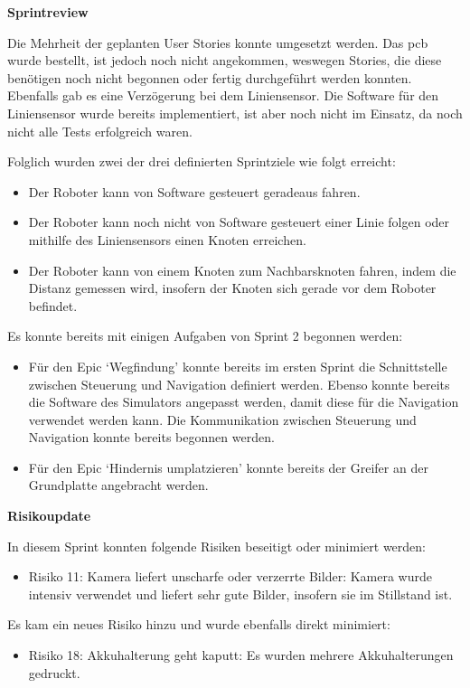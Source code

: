 \textbf{Sprintreview}

Die Mehrheit der geplanten User Stories konnte umgesetzt werden.
Das \acrshort{pcb} wurde bestellt, ist jedoch noch nicht angekommen, weswegen Stories, die diese benötigen noch nicht begonnen oder fertig durchgeführt werden konnten.
Ebenfalls gab es eine Verzögerung bei dem Liniensensor. Die Software für den Liniensensor wurde bereits implementiert, ist aber noch nicht im Einsatz, da noch nicht alle Tests erfolgreich waren.

Folglich wurden zwei der drei definierten Sprintziele wie folgt erreicht:
\begin{itemize}
    \item Der Roboter kann von Software gesteuert geradeaus fahren.
    \item Der Roboter kann noch nicht von Software gesteuert einer Linie folgen oder mithilfe des Liniensensors einen Knoten erreichen.
    \item Der Roboter kann von einem Knoten zum Nachbarsknoten fahren, indem die Distanz gemessen wird, insofern der Knoten sich gerade vor dem Roboter befindet.
\end{itemize}


Es konnte bereits mit einigen Aufgaben von Sprint 2 begonnen werden:

\begin{itemize}
    \item Für den Epic `Wegfindung' konnte bereits im ersten Sprint die Schnittstelle zwischen Steuerung und Navigation definiert werden. Ebenso konnte bereits die Software des Simulators angepasst werden, damit diese für die Navigation verwendet werden kann. Die Kommunikation zwischen Steuerung und Navigation konnte bereits begonnen werden.
    \item Für den Epic `Hindernis umplatzieren' konnte bereits der Greifer an der Grundplatte angebracht werden.
\end{itemize}



\textbf{Risikoupdate}
\label{risks-sprint-1}

In diesem Sprint konnten folgende Risiken beseitigt oder minimiert werden:
\begin{itemize}
    \item Risiko 11: Kamera liefert unscharfe oder verzerrte Bilder: Kamera wurde intensiv verwendet und liefert sehr gute Bilder, insofern sie im Stillstand ist.
\end{itemize}

Es kam ein neues Risiko hinzu und wurde ebenfalls direkt minimiert:
\begin{itemize}
    \item Risiko 18: Akkuhalterung geht kaputt: Es wurden mehrere Akkuhalterungen gedruckt.
\end{itemize}


